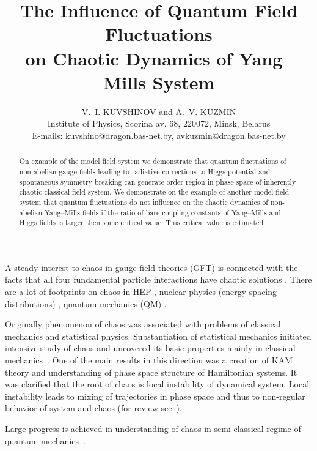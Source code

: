 \documentclass[a4paper,12pt]{article}
\begin{document}
\title{The Influence of Quantum Field Fluctuations\\
 on Chaotic Dynamics of Yang--Mills System}

\author{V.~I. KUVSHINOV and A.~V. KUZMIN \\
Institute of Physics, Scorina av. 68, 220072, Minsk, Belarus \\
E-mails: kuvshino@dragon.bas-net.by, avkuzmin@dragon.bas-net.by}

\maketitle

\begin{abstract}
\noindent On example of the model field system we demonstrate that quantum
fluctuations of non-abelian gauge fields leading to radiative corrections to Higgs
potential and spontaneous symmetry breaking can generate order region in phase space
of inherently chaotic classical field system. We demonstrate on the example of another
model field system that quantum fluctuations do not influence on the chaotic dynamics
of non-abelian Yang--Mills fields if the ratio of bare coupling constants of
Yang--Mills and Higgs fields is larger then some critical value. This critical value
is estimated.
\end{abstract}

\strut\hfill

\noindent A steady interest to chaos in gauge field theories (GFT) \cite{BookGFT} is
connected with the facts that all four fundamental particle interactions have chaotic
solutions \cite{4}. There are a lot of footprints on chaos in HEP \cite{Kawabe, N},
nuclear physics (energy spacing distributions) \cite{Nuclear, Bunakov}, quantum
mechanics (QM) \cite{QM}.

Originally phenomenon of chaos was associated with problems of classical mechanics and
statistical physics. Substantiation of statistical mechanics initiated intensive study
of chaos and uncovered its basic properties mainly in classical
mechanics~\cite{Krylov}.
 One of the main results in this direction was a creation of KAM theory
and understanding of phase space structure of Hamiltonian systems. It was clarified
that the root of chaos is local instability of dynamical system. Local instability
leads to mixing of trajectories in phase space and thus to non-regular behavior of
system and chaos (for review see~\cite{Lihtenberg, Zaslavsky}).

Large progress is achieved in understanding of chaos in semi-classical regime of
quantum mechanics~\cite{B, Robnic}.
\end{document}
